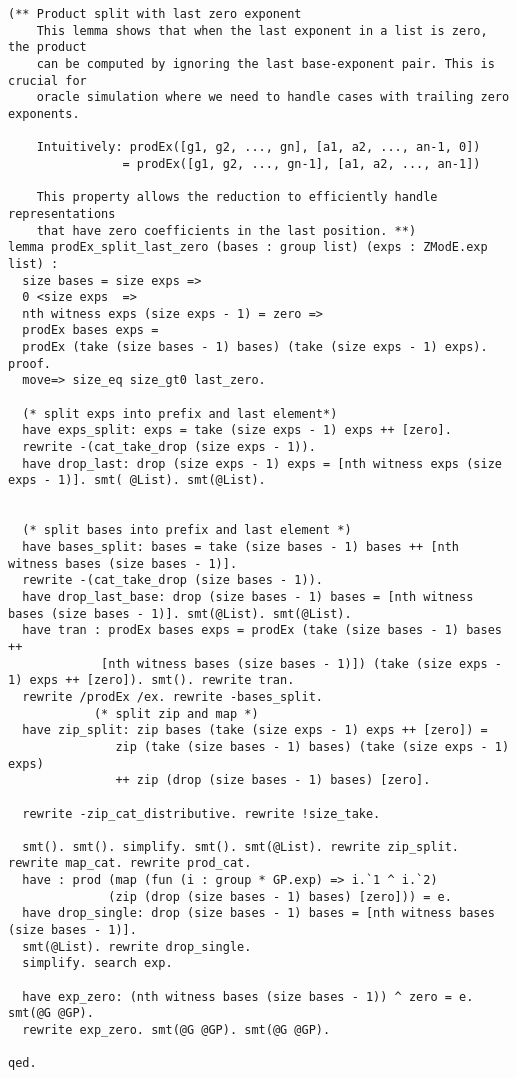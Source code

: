 \begin{lstlisting}[style=easycrypt, caption=Proof of prodEx Split with Last Zero, breaklines=true, breakatwhitespace=true, frame=single, keepspaces=true]
(** Product split with last zero exponent
    This lemma shows that when the last exponent in a list is zero, the product
    can be computed by ignoring the last base-exponent pair. This is crucial for
    oracle simulation where we need to handle cases with trailing zero exponents.
    
    Intuitively: prodEx([g1, g2, ..., gn], [a1, a2, ..., an-1, 0]) 
                = prodEx([g1, g2, ..., gn-1], [a1, a2, ..., an-1])
    
    This property allows the reduction to efficiently handle representations
    that have zero coefficients in the last position. **)
lemma prodEx_split_last_zero (bases : group list) (exps : ZModE.exp list) :
  size bases = size exps =>
  0 <size exps  =>
  nth witness exps (size exps - 1) = zero =>
  prodEx bases exps = 
  prodEx (take (size bases - 1) bases) (take (size exps - 1) exps).
proof.
  move=> size_eq size_gt0 last_zero.
  
  (* split exps into prefix and last element*)
  have exps_split: exps = take (size exps - 1) exps ++ [zero].
  rewrite -(cat_take_drop (size exps - 1)).
  have drop_last: drop (size exps - 1) exps = [nth witness exps (size exps - 1)]. smt( @List). smt(@List). 

  
  (* split bases into prefix and last element *)
  have bases_split: bases = take (size bases - 1) bases ++ [nth witness bases (size bases - 1)].
  rewrite -(cat_take_drop (size bases - 1)).
  have drop_last_base: drop (size bases - 1) bases = [nth witness bases (size bases - 1)]. smt(@List). smt(@List).
  have tran : prodEx bases exps = prodEx (take (size bases - 1) bases ++
             [nth witness bases (size bases - 1)]) (take (size exps - 1) exps ++ [zero]). smt(). rewrite tran.
  rewrite /prodEx /ex. rewrite -bases_split.
            (* split zip and map *)
  have zip_split: zip bases (take (size exps - 1) exps ++ [zero]) = 
               zip (take (size bases - 1) bases) (take (size exps - 1) exps)
               ++ zip (drop (size bases - 1) bases) [zero].
           
  rewrite -zip_cat_distributive. rewrite !size_take.

  smt(). smt(). simplify. smt(). smt(@List). rewrite zip_split.  rewrite map_cat. rewrite prod_cat.
  have : prod (map (fun (i : group * GP.exp) => i.`1 ^ i.`2)
              (zip (drop (size bases - 1) bases) [zero])) = e.
  have drop_single: drop (size bases - 1) bases = [nth witness bases (size bases - 1)].
  smt(@List). rewrite drop_single.
  simplify. search exp.

  have exp_zero: (nth witness bases (size bases - 1)) ^ zero = e. smt(@G @GP).
  rewrite exp_zero. smt(@G @GP). smt(@G @GP).

qed.
\end{lstlisting}


